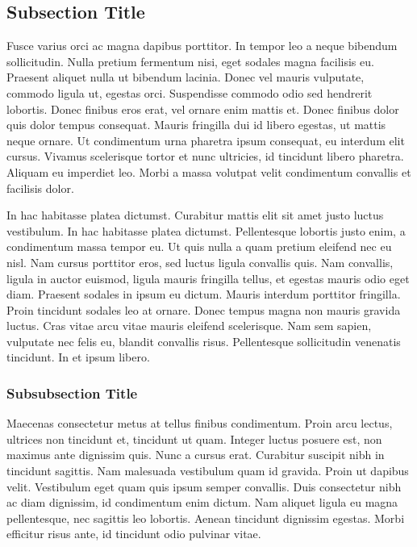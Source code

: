 \documentclass[
	11pt, %
	fleqn, %
	letterpaper, %
]{CommodoreBlueBook}
\begin{document}
\subsection{Subsection Title}

Fusce varius orci ac magna dapibus porttitor. In tempor leo a neque bibendum
sollicitudin. Nulla pretium fermentum nisi, eget sodales magna facilisis eu.
Praesent aliquet nulla ut bibendum lacinia. Donec vel mauris vulputate, commodo
ligula ut, egestas orci. Suspendisse commodo odio sed hendrerit lobortis. Donec
finibus eros erat, vel ornare enim mattis et. Donec finibus dolor quis dolor
tempus consequat. Mauris fringilla dui id libero egestas, ut mattis neque
ornare. Ut condimentum urna pharetra ipsum consequat, eu interdum elit cursus.
Vivamus scelerisque tortor et nunc ultricies, id tincidunt libero pharetra.
Aliquam eu imperdiet leo. Morbi a massa volutpat velit condimentum convallis et
facilisis dolor.

In hac habitasse platea dictumst. Curabitur mattis elit sit amet justo luctus
vestibulum. In hac habitasse platea dictumst. Pellentesque lobortis justo enim,
a condimentum massa tempor eu. Ut quis nulla a quam pretium eleifend nec eu
nisl. Nam cursus porttitor eros, sed luctus ligula convallis quis. Nam
convallis, ligula in auctor euismod, ligula mauris fringilla tellus, et egestas
mauris odio eget diam. Praesent sodales in ipsum eu dictum. Mauris interdum
porttitor fringilla. Proin tincidunt sodales leo at ornare. Donec tempus magna
non mauris gravida luctus. Cras vitae arcu vitae mauris eleifend scelerisque.
Nam sem sapien, vulputate nec felis eu, blandit convallis risus. Pellentesque
sollicitudin venenatis tincidunt. In et ipsum libero.

\subsubsection{Subsubsection Title} 

Maecenas consectetur metus at tellus finibus condimentum. Proin arcu lectus,
ultrices non tincidunt et, tincidunt ut quam. Integer luctus posuere est, non
maximus ante dignissim quis. Nunc a cursus erat. Curabitur suscipit nibh in
tincidunt sagittis. Nam malesuada vestibulum quam id gravida. Proin ut dapibus
velit. Vestibulum eget quam quis ipsum semper convallis. Duis consectetur nibh
ac diam dignissim, id condimentum enim dictum. Nam aliquet ligula eu magna
pellentesque, nec sagittis leo lobortis. Aenean tincidunt dignissim egestas.
Morbi efficitur risus ante, id tincidunt odio pulvinar vitae.
\end{document}

